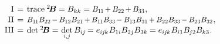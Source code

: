 \vspace{-0.25em}
\begin{equation}\label{invariants:2}
\begin{array}{r@{\hspace{.4em}}c@{\hspace{.4em}}l}
\mathrm{I} & = & \trace{^2\!\bm{B}} = B_{kk}
= \scalebox{0.92}[0.96]{$B_{1\hspace{-0.1ex}1} \hspace{-0.2ex} + \hspace{-0.1ex} B_{22} \hspace{-0.2ex} + \hspace{-0.1ex} B_{33}$}
\hspace{.1ex} ,
\\[.1em]
%
\mathrm{II} & = & \scalebox{.92}[.96]{$B_{1\hspace{-0.1ex}1}B_{22} \hspace{-0.2ex} - \hspace{-0.1ex} B_{12}B_{21} \hspace{-0.2ex} + \hspace{-0.1ex} B_{1\hspace{-0.1ex}1}B_{33} \hspace{-0.2ex} - \hspace{-0.1ex} B_{13}B_{31} \hspace{-0.2ex} + \hspace{-0.1ex} B_{22}B_{33} \hspace{-0.2ex} - \hspace{-0.1ex} B_{23}B_{32}$}
\hspace{.1ex} ,
\\[.1em]
%
\mathrm{III} & = & \operatorname{det} \hspace{.1ex} {^2\!\bm{B}}
= \hspace{.15ex} \underset{\raisebox{.15em}{\scalebox{.7}{$i$,$\hspace{.15ex}j$}}}{\operatorname{det}} \, B_{i\hspace{-0.1ex}j} \hspace{-0.15ex}
= e_{i\hspace{-0.1ex}j\hspace{-0.1ex}k} \hspace{.1ex} B_{1i} B_{2j} B_{3k} \hspace{-0.1ex}
= e_{i\hspace{-0.1ex}j\hspace{-0.1ex}k} \hspace{.1ex} B_{i1} B_{\hspace{-0.1ex}j2} B_{k3}
\hspace{.1ex} .
\end{array}\end{equation}

